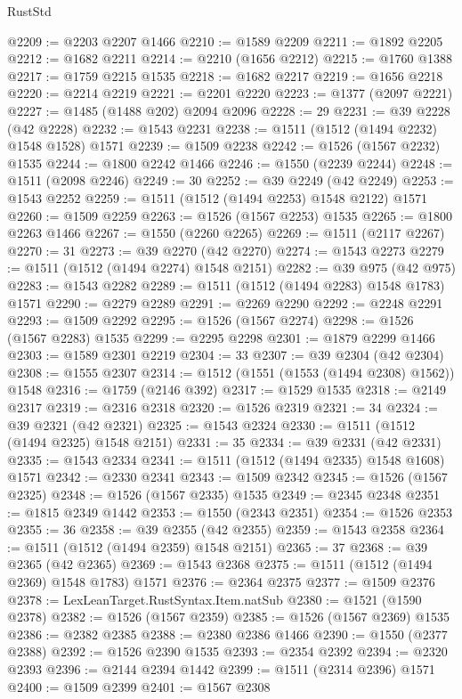 \begin{lexlean}{RustStd}
\begin{coremodule}
{\begin{coremodule}
{{{{{{{{{{{{{{{{{{{{{{{{{{{{{{{{{{{@2209 := @2203 @2207 @1466
@2210 := @1589 @2209
@2211 := @1892 @2205
@2212 := @1682 @2211
@2214 := @2210 (@1656 @2212)
@2215 := @1760 @1388
@2217 := @1759 @2215 @1535
@2218 := @1682 @2217
@2219 := @1656 @2218
@2220 := @2214 @2219
@2221 := @2201 @2220
@2223 := @1377 (@2097 @2221)
@2227 := @1485 (@1488 @202) @2094 @2096
@2228 := 29
@2231 := @39 @2228 (@42 @2228)
@2232 := @1543 @2231
@2238 := @1511 (@1512 (@1494 @2232) @1548 @1528) @1571
@2239 := @1509 @2238
@2242 := @1526 (@1567 @2232) @1535
@2244 := @1800 @2242 @1466
@2246 := @1550 (@2239 @2244)
@2248 := @1511 (@2098 @2246)
@2249 := 30
@2252 := @39 @2249 (@42 @2249)
@2253 := @1543 @2252
@2259 := @1511 (@1512 (@1494 @2253) @1548 @2122) @1571
@2260 := @1509 @2259
@2263 := @1526 (@1567 @2253) @1535
@2265 := @1800 @2263 @1466
@2267 := @1550 (@2260 @2265)
@2269 := @1511 (@2117 @2267)
@2270 := 31
@2273 := @39 @2270 (@42 @2270)
@2274 := @1543 @2273
@2279 := @1511 (@1512 (@1494 @2274) @1548 @2151)
@2282 := @39 @975 (@42 @975)
@2283 := @1543 @2282
@2289 := @1511 (@1512 (@1494 @2283) @1548 @1783) @1571
@2290 := @2279 @2289
@2291 := @2269 @2290
@2292 := @2248 @2291
@2293 := @1509 @2292
@2295 := @1526 (@1567 @2274)
@2298 := @1526 (@1567 @2283) @1535
@2299 := @2295 @2298
@2301 := @1879 @2299 @1466
@2303 := @1589 @2301 @2219
@2304 := 33
@2307 := @39 @2304 (@42 @2304)
@2308 := @1555 @2307
@2314 := @1512 (@1551 (@1553 (@1494 @2308) @1562)) @1548
@2316 := @1759 (@2146 @392)
@2317 := @1529 @1535
@2318 := @2149 @2317
@2319 := @2316 @2318
@2320 := @1526 @2319
@2321 := 34
@2324 := @39 @2321 (@42 @2321)
@2325 := @1543 @2324
@2330 := @1511 (@1512 (@1494 @2325) @1548 @2151)
@2331 := 35
@2334 := @39 @2331 (@42 @2331)
@2335 := @1543 @2334
@2341 := @1511 (@1512 (@1494 @2335) @1548 @1608) @1571
@2342 := @2330 @2341
@2343 := @1509 @2342
@2345 := @1526 (@1567 @2325)
@2348 := @1526 (@1567 @2335) @1535
@2349 := @2345 @2348
@2351 := @1815 @2349 @1442
@2353 := @1550 (@2343 @2351)
@2354 := @1526 @2353
@2355 := 36
@2358 := @39 @2355 (@42 @2355)
@2359 := @1543 @2358
@2364 := @1511 (@1512 (@1494 @2359) @1548 @2151)
@2365 := 37
@2368 := @39 @2365 (@42 @2365)
@2369 := @1543 @2368
@2375 := @1511 (@1512 (@1494 @2369) @1548 @1783) @1571
@2376 := @2364 @2375
@2377 := @1509 @2376
@2378 := LexLeanTarget.RustSyntax.Item.natSub
@2380 := @1521 (@1590 @2378)
@2382 := @1526 (@1567 @2359)
@2385 := @1526 (@1567 @2369) @1535
@2386 := @2382 @2385
@2388 := @2380 @2386 @1466
@2390 := @1550 (@2377 @2388)
@2392 := @1526 @2390 @1535
@2393 := @2354 @2392
@2394 := @2320 @2393
@2396 := @2144 @2394 @1442
@2399 := @1511 (@2314 @2396) @1571
@2400 := @1509 @2399
@2401 := @1567 @2308
}}}}}}}}}}}}}}}}}}}}}}}}}}}}}}}}}}}
\end{coremodule}}
\end{coremodule}
\end{lexlean}
